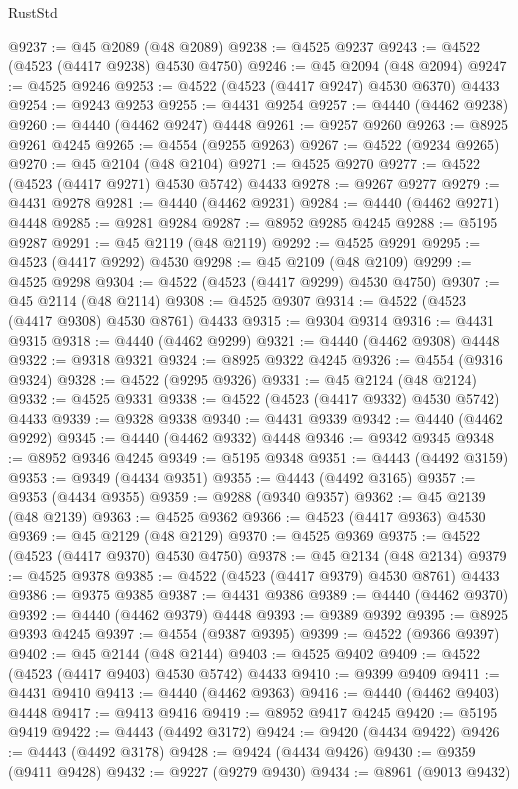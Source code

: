 \begin{lexlean}{RustStd}
\begin{coremodule}
{\begin{coremodule}
{{{{{{{{{{{{{{{{{{{{{{{{{{{{{{{{{{{{{{{{{{{{{{{{{{{{{{{{{{{{@9237 := @45 @2089 (@48 @2089)
@9238 := @4525 @9237
@9243 := @4522 (@4523 (@4417 @9238) @4530 @4750)
@9246 := @45 @2094 (@48 @2094)
@9247 := @4525 @9246
@9253 := @4522 (@4523 (@4417 @9247) @4530 @6370) @4433
@9254 := @9243 @9253
@9255 := @4431 @9254
@9257 := @4440 (@4462 @9238)
@9260 := @4440 (@4462 @9247) @4448
@9261 := @9257 @9260
@9263 := @8925 @9261 @4245
@9265 := @4554 (@9255 @9263)
@9267 := @4522 (@9234 @9265)
@9270 := @45 @2104 (@48 @2104)
@9271 := @4525 @9270
@9277 := @4522 (@4523 (@4417 @9271) @4530 @5742) @4433
@9278 := @9267 @9277
@9279 := @4431 @9278
@9281 := @4440 (@4462 @9231)
@9284 := @4440 (@4462 @9271) @4448
@9285 := @9281 @9284
@9287 := @8952 @9285 @4245
@9288 := @5195 @9287
@9291 := @45 @2119 (@48 @2119)
@9292 := @4525 @9291
@9295 := @4523 (@4417 @9292) @4530
@9298 := @45 @2109 (@48 @2109)
@9299 := @4525 @9298
@9304 := @4522 (@4523 (@4417 @9299) @4530 @4750)
@9307 := @45 @2114 (@48 @2114)
@9308 := @4525 @9307
@9314 := @4522 (@4523 (@4417 @9308) @4530 @8761) @4433
@9315 := @9304 @9314
@9316 := @4431 @9315
@9318 := @4440 (@4462 @9299)
@9321 := @4440 (@4462 @9308) @4448
@9322 := @9318 @9321
@9324 := @8925 @9322 @4245
@9326 := @4554 (@9316 @9324)
@9328 := @4522 (@9295 @9326)
@9331 := @45 @2124 (@48 @2124)
@9332 := @4525 @9331
@9338 := @4522 (@4523 (@4417 @9332) @4530 @5742) @4433
@9339 := @9328 @9338
@9340 := @4431 @9339
@9342 := @4440 (@4462 @9292)
@9345 := @4440 (@4462 @9332) @4448
@9346 := @9342 @9345
@9348 := @8952 @9346 @4245
@9349 := @5195 @9348
@9351 := @4443 (@4492 @3159)
@9353 := @9349 (@4434 @9351)
@9355 := @4443 (@4492 @3165)
@9357 := @9353 (@4434 @9355)
@9359 := @9288 (@9340 @9357)
@9362 := @45 @2139 (@48 @2139)
@9363 := @4525 @9362
@9366 := @4523 (@4417 @9363) @4530
@9369 := @45 @2129 (@48 @2129)
@9370 := @4525 @9369
@9375 := @4522 (@4523 (@4417 @9370) @4530 @4750)
@9378 := @45 @2134 (@48 @2134)
@9379 := @4525 @9378
@9385 := @4522 (@4523 (@4417 @9379) @4530 @8761) @4433
@9386 := @9375 @9385
@9387 := @4431 @9386
@9389 := @4440 (@4462 @9370)
@9392 := @4440 (@4462 @9379) @4448
@9393 := @9389 @9392
@9395 := @8925 @9393 @4245
@9397 := @4554 (@9387 @9395)
@9399 := @4522 (@9366 @9397)
@9402 := @45 @2144 (@48 @2144)
@9403 := @4525 @9402
@9409 := @4522 (@4523 (@4417 @9403) @4530 @5742) @4433
@9410 := @9399 @9409
@9411 := @4431 @9410
@9413 := @4440 (@4462 @9363)
@9416 := @4440 (@4462 @9403) @4448
@9417 := @9413 @9416
@9419 := @8952 @9417 @4245
@9420 := @5195 @9419
@9422 := @4443 (@4492 @3172)
@9424 := @9420 (@4434 @9422)
@9426 := @4443 (@4492 @3178)
@9428 := @9424 (@4434 @9426)
@9430 := @9359 (@9411 @9428)
@9432 := @9227 (@9279 @9430)
@9434 := @8961 (@9013 @9432)
}}}}}}}}}}}}}}}}}}}}}}}}}}}}}}}}}}}}}}}}}}}}}}}}}}}}}}}}}}}}
\end{coremodule}}
\end{coremodule}
\end{lexlean}
